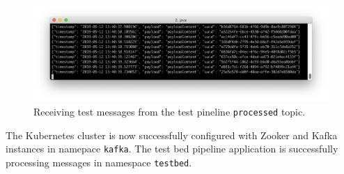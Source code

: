 \begin{enumerate}
   \begin{figure}[H]
 	\centering  
 	\includegraphics[width=\linewidth]{figures/appendixA/testbed-processed-messages.png}
 	\caption{Receiving test messages from the test pineline \texttt{processed} topic.}
 \end{figure}

The Kubernetes cluster is now successfully configured with Zooker and Kafka instances in namepace \texttt{kafka}. The test bed pipeline application is successfully processing messages in namespace \texttt{testbed}.
 
 
\end{enumerate}